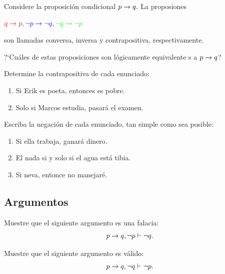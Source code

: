  \begin{exmp}
  \label{lip:sol:4.7}
  Considere la proposici\'on condicional $p \rightarrow q.$ La proposiones 
  \begin{center}
  ${\color{red}q \rightarrow p,} {\color{blue}\, \neg p \rightarrow \neg q,} \, {\color{green}\neg q \rightarrow \neg p}$
  \end{center}
son llamadas {\color{red} conversa,} {\color{blue}inversa} y {\color{green} contrapositiva}, respectivamente.


?`Cu\'ales de estas proposiciones son l\'ogicamente equivalente s a $p\rightarrow q$?
 \end{exmp}




 \begin{exmp}
  Determine la contrapositiva de cada enunciado:
  \begin{enumerate}
   \item Si Erik es poeta, entonces es pobre. 
   \item Solo si Marcos estudia, pasar\'a el examen. 
  \end{enumerate}

 \end{exmp}




 \begin{exmp}
  Escriba la negaci\'on de cada enunciado, tan simple como sea posible:
  \begin{enumerate}
   \item Si ella trabaja, ganar\'a dinero. 
   \item El nada si y solo si el agua est\'a tibia. 
   \item Si neva, entonce no manejar\'e.
  \end{enumerate}

 \end{exmp}



\subsection{Argumentos}


 \begin{exmp}
  Muestre que el siguiente argumento es una falacia:
 $$
 p\rightarrow q, \neg p \vdash \neg q.
 $$
 \end{exmp}




 \begin{exmp}
  Muestre que el siguiente argumento es v\'alido:
 $$
 p\rightarrow q, \neg q \vdash \neg p.
 $$
 \end{exmp}




